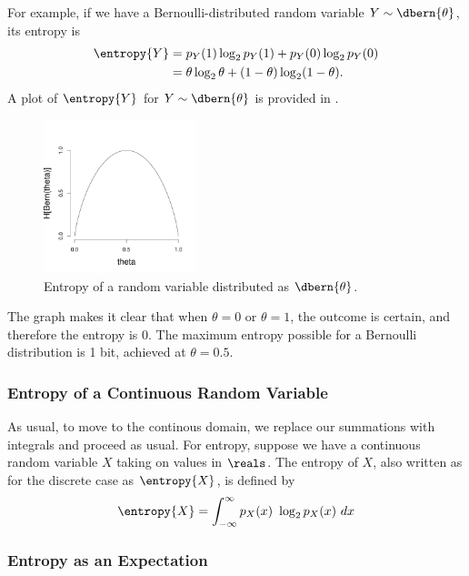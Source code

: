 For example, if we have a Bernoulli-distributed random
variable $Y \sim \dbern{\theta}$, its entropy is
%
\begin{align}
\entropy{Y} &= p_Y(1) \log_2 p_Y(1) + p_Y(0) \log_2 p_Y(0)
\\
&= \theta \log_2 \theta + (1 - \theta) \log_2 (1 - \theta).
\end{align}
%
A plot of $\entropy{Y}$ for $Y \sim \dbern{\theta}$ is provided
in .
%
\begin{figure}
\begin{center}
\includegraphics[height=1.75in]{pdfs/bern-entropy.pdf}
\end{center}%
\vspace*{-18pt}
\caption{Entropy of a random variable distributed as $\dbern{\theta}$.}\label{fig:bern-entropy}
\end{figure}
%
The graph makes it clear that when $\theta=0$ or $\theta=1$, the
outcome is certain, and therefore the entropy is 0.  The maximum
entropy possible for a Bernoulli distribution is 1 bit, achieved at
$\theta = 0.5$.  

\subsubsection{Entropy of a Continuous Random Variable}

As usual, to move to the continous domain, we replace our summations
with integrals and proceed as usual.  For entropy, suppose we
have a continuous random variable $X$ taking on values in $\reals$.
The entropy of $X$, also written as for the discrete case as $\entropy{X}$,
is defined by
%
\begin{equation}
\entropy{X} = \int_{-\infty}^{\infty} p_X(x) \ \log_2 p_X(x) \ dx
\end{equation}


\subsubsection{Entropy as an Expectation}


